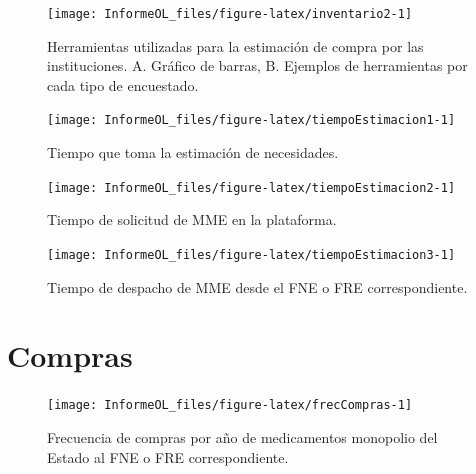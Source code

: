 \documentclass[
  oneside]{book}
\begin{document}
\begin{figure}

{\centering \texttt{[image: InformeOL\_files/figure-latex/inventario2-1]} 

}

\caption{Herramientas utilizadas para la estimación de compra por las instituciones. A. Gráfico de barras, B. Ejemplos de herramientas por cada tipo de encuestado.}\label{fig:inventario2}
\end{figure}

\begin{figure}

{\centering \texttt{[image: InformeOL\_files/figure-latex/tiempoEstimacion1-1]} 

}

\caption{Tiempo que toma la estimación de necesidades.}\label{fig:tiempoEstimacion1}
\end{figure}

\begin{figure}

{\centering \texttt{[image: InformeOL\_files/figure-latex/tiempoEstimacion2-1]} 

}

\caption{Tiempo de solicitud de MME en la plataforma.}\label{fig:tiempoEstimacion2}
\end{figure}

\begin{figure}

{\centering \texttt{[image: InformeOL\_files/figure-latex/tiempoEstimacion3-1]} 

}

\caption{Tiempo de despacho de MME desde el FNE o FRE correspondiente.}\label{fig:tiempoEstimacion3}
\end{figure}

\hypertarget{compras}{%
\chapter{Compras}\label{compras}}

\begin{figure}

{\centering \texttt{[image: InformeOL\_files/figure-latex/frecCompras-1]} 

}

\caption{Frecuencia de compras por año de medicamentos monopolio del Estado al FNE o FRE correspondiente.}\label{fig:frecCompras}
\end{figure}
\end{document}
